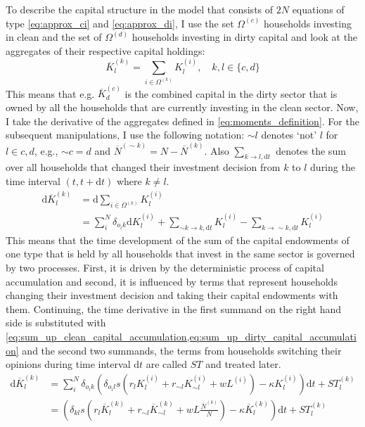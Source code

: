 To describe the capital structure in the model that consists of $2N$ equations of type \cref{eq:approx_ci} and \cref{eq:approx_di}, I use the set $\Omega^{(c)}$ households investing in clean and the set of $\Omega^{(d)}$ households investing in dirty capital and look at the aggregates of their respective capital holdings:
\begin{equation}
  \overbar{K}_l^{(k)} = \sum_{i \in \Omega^{(k)}} K_l^{(i)}, \quad k, l \in \{c, d\}
	\label{eq:moments_definition}
\end{equation}
This means that e.g. $\overbar{K}_d^{(c)}$ is the combined capital in the dirty sector that is owned by all the households that are currently investing in the clean sector.
Now, I take the derivative of the aggregates defined in \cref{eq:moments_definition}. For the subsequent manipulations, I use the following notation: $\sim l$ denotes `not' $l$ for $l \in {c, d}$, e.g., $\sim c = d$ and $\overbar{N}^{(\sim k)} = N - \overbar{N}^{(k)}$. Also $\sum\nolimits_{k \rightarrow l, \mathrm{d}t}$ denotes the sum over all households that changed their investment decision from $k$ to $l$ during the time interval $(t, t+\mathrm{d}t)$ where $k \neq l$. 
\begin{align}
\mathrm{d}\overbar{K}_l^{(k)} &= \mathrm{d} \sum_{i \in \Omega^{(k)}} K_l^{(i)} \\ \nonumber
&= \sum_{i}^{N} \delta_{o_ik} \mathrm{d}K_l^{(i)} + \sum_{\sim k \rightarrow k, \mathrm{d}t} K_l^{(i)} - \sum_{ k \rightarrow \sim k, \mathrm{d}t} K_l^{(i)}
  \label{eq:approx_agg_capital_time_deriv}
\end{align}
This means that the time development of the sum of the capital endowments of one type that is held by all households that invest in the same sector is governed by two processes. First, it is driven by the deterministic process of capital accumulation and second, it is influenced by terms that represent households changing their investment decision and taking their capital endowments with them. 
Continuing, the time derivative in the first summand on the right hand side is substituted with \cref{eq:sum_up_clean_capital_accumulation,eq:sum_up_dirty_capital_accumulation} and the second two summands, the terms from households switching their opinions during time interval $\mathrm{d}t$ are called $ST$ and treated later.
\begin{align}
  \mathrm{d}\overbar{K}_l^{(k)} &= \sum_{i}^{N} \delta_{o_ik} \left( \delta_{o_il}s\left( r_l K_l^{(i)} + r_{\sim l} K_{\sim l}^{(i)} + w L^{(i)} \right) -\kappa K_l^{(i)} \right)\mathrm{d}t + ST_{l}^{(k)} \\
  &= \left(\delta_{kl} s\left( r_l \overbar{K}_l^{(k)} + r_{\sim l} \overbar{K}_{\sim l}^{(k)} + w  L \frac{\overbar{N}^{(k)}}{N} \right) - \kappa \overbar{K}_l^{(k)} \right)\mathrm{d}t + ST_{l}^{(k)} \label{eq:mc_step2}
\end{align}
